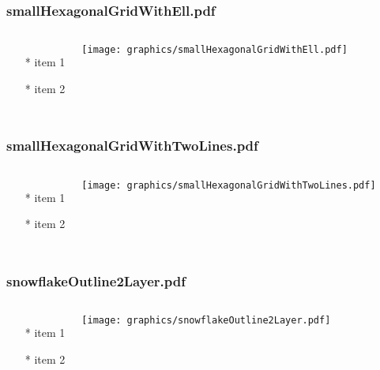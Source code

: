 \documentclass{beamer}
\begin{document}
\begin{frame} \frametitle{smallHexagonalGridWithEll.pdf}
    \begin{columns}[c]
        \begin{itemize}
            \item[*] item 1
            \item[*] item 2
        \end{itemize}
        \begin{minipage}{\linewidth}
            \begin{center}
            \texttt{[image: graphics/smallHexagonalGridWithEll.pdf]}
            \label{gfx:smallHexagonalGridWithEll.pdf}
            \end{center}
        \end{minipage}
    \end{columns}
\end{frame}
\begin{frame} \frametitle{smallHexagonalGridWithTwoLines.pdf}
    \begin{columns}[c]
        \begin{itemize}
            \item[*] item 1
            \item[*] item 2
        \end{itemize}
        \begin{minipage}{\linewidth}
            \begin{center}
            \texttt{[image: graphics/smallHexagonalGridWithTwoLines.pdf]}
            \label{gfx:smallHexagonalGridWithTwoLines.pdf}
            \end{center}
        \end{minipage}
    \end{columns}
\end{frame}
\begin{frame} \frametitle{snowflakeOutline2Layer.pdf}
    \begin{columns}[c]
        \begin{itemize}
            \item[*] item 1
            \item[*] item 2
        \end{itemize}
        \begin{minipage}{\linewidth}
            \begin{center}
            \texttt{[image: graphics/snowflakeOutline2Layer.pdf]}
            \label{gfx:snowflakeOutline2Layer.pdf}
            \end{center}
        \end{minipage}
    \end{columns}
\end{frame}
\end{document}
